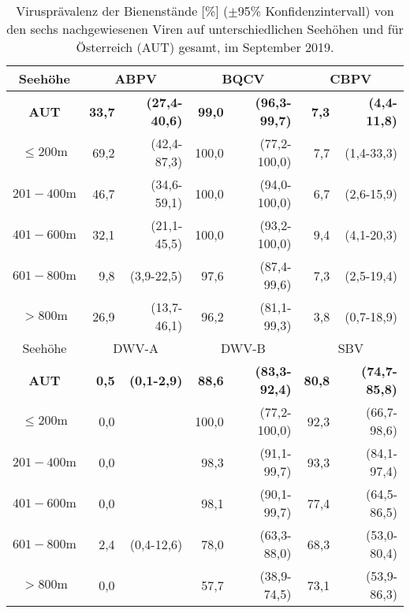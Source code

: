 \begin{table}[H]
    \caption{Virusprävalenz der Bienenstände [\%] (\(\pm \)95\% Konfidenzintervall) von den sechs nachgewiesenen Viren auf unterschiedlichen Seehöhen und für Österreich (AUT) gesamt, im September 2019.}
    \centering
    \footnotesize
    \label{tab:k:praevalenz_Seehoehe}
    \begin{tabular}{c|*{2}{rr|}rr}
        \toprule    
        \multicolumn{1}{c|}{Seehöhe} & 
        \multicolumn{2}{c|}{ABPV}   & 
        \multicolumn{2}{c|}{BQCV}   & 
        \multicolumn{2}{c}{CBPV}   \\
        \midrule
        
	    \textbf{AUT} & \textbf{33,7} & \textbf{(27,4-40,6)} & \textbf{99,0} & \textbf{(96,3-99,7)} &  \textbf{7,3} &  \textbf{(4,4-11,8)} \\
        $\leq200\si{\m}$ & 69,2 & (42,4-87,3) & 100,0 & (77,2-100,0) &  7,7 &  (1,4-33,3) \\
        $201-400\si{\m}$ & 46,7 & (34,6-59,1) & 100,0 & (94,0-100,0) &  6,7 &  (2,6-15,9) \\
        $401-600\si{\m}$ & 32,1 & (21,1-45,5) & 100,0 & (93,2-100,0) &  9,4 &  (4,1-20,3) \\
        $601-800\si{\m}$ & 9,8 & (3,9-22,5) & 97,6 & (87,4-99,6) &  7,3 &  (2,5-19,4) \\
        $>800\si{\m}$ & 26,9 & (13,7-46,1) & 96,2 & (81,1-99,3) &  3,8 &  (0,7-18,9) \\
        
        \midrule    
        \multicolumn{1}{c|}{Seehöhe} & 
        \multicolumn{2}{c|}{DWV-A}   & 
        \multicolumn{2}{c|}{DWV-B}   & 
        \multicolumn{2}{c}{SBV}   \\
        \midrule

	    \textbf{AUT} & \textbf{0,5} & \textbf{(0,1-2,9)} & \textbf{88,6} & \textbf{(83,3-92,4)} &  \textbf{80,8} &  \textbf{(74,7-85,8)} \\
        $\leq200\si{\m}$ & 0,0 &         & 100,0 & (77,2-100,0) &  92,3 &  (66,7-98,6) \\
        $201-400\si{\m}$ & 0,0 &         & 98,3 & (91,1-99,7) &  93,3 &  (84,1-97,4) \\
        $401-600\si{\m}$ & 0,0 &         & 98,1 & (90,1-99,7) &  77,4 &  (64,5-86,5) \\
        $601-800\si{\m}$ & 2,4 & (0,4-12,6) & 78,0 & (63,3-88,0) &  68,3 &  (53,0-80,4) \\
        $>800\si{\m}$ & 0,0 &        & 57,7 & (38,9-74,5) &  73,1 &  (53,9-86,3) \\
        

        \bottomrule
    \end{tabular}

\end{table}